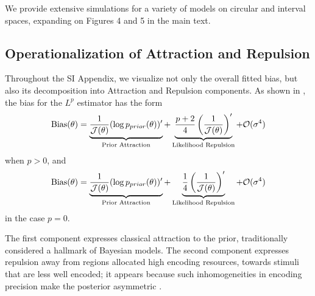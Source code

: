 \documentclass[si.tex]{subfiles}
\begin{document}


We provide extensive simulations for a variety of models on circular and interval spaces, expanding on Figures 4 and 5 in the main text.

\subsection{Operationalization of Attraction and Repulsion}\label{sec:att-rep}

Throughout the SI Appendix, we visualize not only the overall fitted bias, but also its decomposition into Attraction and Repulsion components.
As shown in \cite{hahn2024unifying}, the bias for the $L^p$ estimator has the form
\begin{equation}\label{eq:ana-bias-att-rep}
    \text{Bias}(\theta) = \underbrace{\frac{1}{\mathcal{J}(\theta)} (\log p_{prior}(\theta))'}_{\text{Prior Attraction}} + \underbrace{\frac{p+2}{4} \left(\frac{1}{\mathcal{J}(\theta)}\right)'}_{\text{Likelihood Repulsion}} + \mathcal{O}(\sigma^4)
\end{equation}
when $p > 0$, and
\begin{equation}\label{eq:ana-bias-att-rep-0}
    \text{Bias}(\theta) = \underbrace{\frac{1}{\mathcal{J}(\theta)} (\log p_{prior}(\theta))'}_{\text{Prior Attraction}} + \underbrace{\frac{1}{4} \left(\frac{1}{\mathcal{J}(\theta)}\right)'}_{\text{Likelihood Repulsion}} + \mathcal{O}(\sigma^4)
\end{equation}
in the case $p=0$.

The first component expresses classical attraction  to the prior, traditionally considered a hallmark of Bayesian models.
The second component expresses repulsion away from regions allocated high encoding resources, towards stimuli that are less well encoded; it appears because such inhomogeneities in encoding precision make the posterior asymmetric \citep{Wei2012,Wei2015ABO,Wei2017LawfulRB,PratCarrabin2021BiasAV,hahn2024unifying}.
\end{document}
